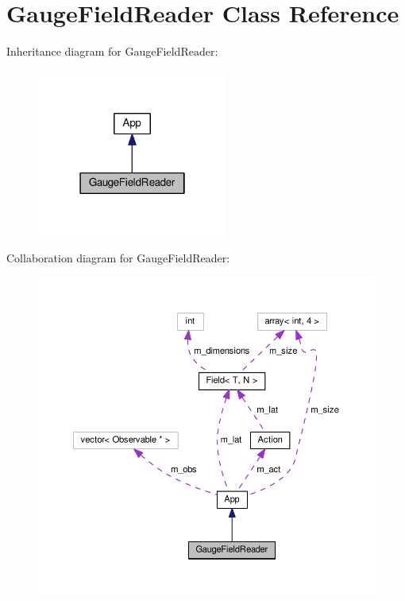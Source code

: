 \hypertarget{classGaugeFieldReader}{}\section{Gauge\+Field\+Reader Class Reference}
\label{classGaugeFieldReader}


Inheritance diagram for Gauge\+Field\+Reader\+:
\nopagebreak
\begin{figure}[H]
\begin{center}
\leavevmode
\includegraphics[width=178pt]{classGaugeFieldReader__inherit__graph}
\end{center}
\end{figure}


Collaboration diagram for Gauge\+Field\+Reader\+:
\nopagebreak
\begin{figure}[H]
\begin{center}
\leavevmode
\includegraphics[width=350pt]{classGaugeFieldReader__coll__graph}
\end{center}
\end{figure}
